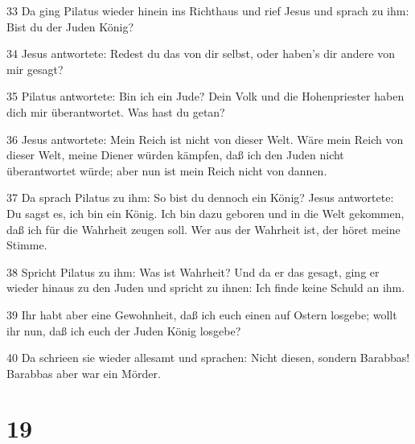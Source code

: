 \par 33 Da ging Pilatus wieder hinein ins Richthaus und rief Jesus und sprach zu ihm: Bist du der Juden König?
\par 34 Jesus antwortete: Redest du das von dir selbst, oder haben's dir andere von mir gesagt?
\par 35 Pilatus antwortete: Bin ich ein Jude? Dein Volk und die Hohenpriester haben dich mir überantwortet. Was hast du getan?
\par 36 Jesus antwortete: Mein Reich ist nicht von dieser Welt. Wäre mein Reich von dieser Welt, meine Diener würden kämpfen, daß ich den Juden nicht überantwortet würde; aber nun ist mein Reich nicht von dannen.
\par 37 Da sprach Pilatus zu ihm: So bist du dennoch ein König? Jesus antwortete: Du sagst es, ich bin ein König. Ich bin dazu geboren und in die Welt gekommen, daß ich für die Wahrheit zeugen soll. Wer aus der Wahrheit ist, der höret meine Stimme.
\par 38 Spricht Pilatus zu ihm: Was ist Wahrheit? Und da er das gesagt, ging er wieder hinaus zu den Juden und spricht zu ihnen: Ich finde keine Schuld an ihm.
\par 39 Ihr habt aber eine Gewohnheit, daß ich euch einen auf Ostern losgebe; wollt ihr nun, daß ich euch der Juden König losgebe?
\par 40 Da schrieen sie wieder allesamt und sprachen: Nicht diesen, sondern Barabbas! Barabbas aber war ein Mörder.

\chapter{19}

